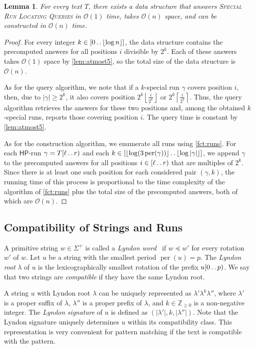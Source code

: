 \documentclass[a4paper]{article}
\newtheorem{lemma}[theorem]{Lemma}
\theoremstyle{definition}
\theoremstyle{remark}
\newcommand{\HP}{\mathsf{HP}}
\newcommand{\ceil}[1]{\left\lceil #1 \right\rceil}
\newcommand{\floor}[1]{\left\lfloor #1 \right\rfloor}
\newcommand{\integ}{\mathbb{Z}}
\newcommand{\dd}{\mathinner{\ldotp\ldotp}}
\DeclareMathOperator{\per}{per}
\newcommand{\Oh}{\mathcal{O}}
\begin{document}
\begin{lemma}\label{lem:run_finder}
  For every text $T$, there exists a data structure that answers \textsc{Special Run Locating Queries} in $\Oh(1)$ time,
  takes $\Oh(n)$ space, and can be constructed in $\Oh(n)$ time.
\end{lemma}
\begin{proof}
  For every integer $k\in [0\dd \floor{\log n}]$, the data structure contains the precomputed answers for all positions $i$ divisible by $2^k$.
  Each of these answers takes $\Oh(1)$ space by \cref{lem:atmost5}, so the total size of the data structure is $\Oh(n)$.

  As for the query algorithm, we note that if a $k$-special run $\gamma$ covers position $i$, then,
  due to $|\gamma|\ge 2^{k}$, it also covers position $2^k \floor{\frac{i}{2^k}}$ or $2^k \ceil{\frac{i}{2^k}}$.
  Thus, the query algorithm retrieves the answers for these two positions and, among the obtained $k$-special runs,
  reports those covering position $i$. The query time is constant by \cref{lem:atmost5}.

  As for the construction algorithm, we enumerate all runs using \cref{fct:runs}.
  For each $\HP$-run $\gamma=T[\ell\dd r)$ and each $k\in [\floor{\log(3\per(\gamma))}\dd \floor{\log |\gamma|}]$,
  we append $\gamma$ to the precomputed answers for all positions $i\in [\ell\dd r)$ that are multiples of $2^k$.
  Since there is at least one such position for each considered pair $(\gamma,k)$, the running time of this process
  is proportional to the time complexity of the algorithm of \cref{fct:runs} plus the total size of the precomputed answers, both of which are $\Oh(n)$.
\end{proof}


\subsection{Compatibility of Strings and Runs}\label{sec:comp}
A primitive string $w\in \Sigma^+$ is called a \emph{Lyndon word}~\cite{Lyndon1954,chen1958free} if $w\preceq w'$ for every rotation $w'$ of $w$.
Let $u$ be a string with the smallest period $\per(u)=p$.
The \emph{Lyndon root} $\lambda$ of $u$ is the lexicographically smallest rotation of the prefix $u[0\dd p)$.
We say that two strings are \emph{compatible} if they have the same Lyndon root.

A string $u$ with Lyndon root $\lambda$ can be uniquely represented as $\lambda'\lambda^k \lambda''$, where $\lambda'$ is a proper suffix of $\lambda$,
 $\lambda''$ is a proper prefix of $\lambda$, and $k\in \integ_{\ge 0}$ is a non-negative integer.
The \emph{Lyndon signature} of $u$ is defined as $(|\lambda'|,k,|\lambda''|)$.
Note that the Lyndon signature uniquely determines $u$ within its compatibility class.
This representation is very convenient for pattern matching if the text is compatible with the pattern.
\end{document}
